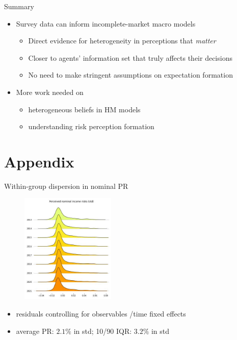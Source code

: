 \documentclass{beamer}
\begin{document}
\begin{frame}{Summary}
	
	\begin{itemize}
 	\item Survey data can inform incomplete-market macro models 
 	\begin{itemize}
 		\item Direct evidence for heterogeneity in perceptions that \textit{matter}
 		\item Closer to agents' information set that truly affects their decisions
 			\item No need to make stringent assumptions on expectation formation
 	\end{itemize}

	\item More work needed on 
	\begin{itemize}
		\item heterogeneous beliefs in HM models
		\item understanding risk perception formation  
	\end{itemize}
	\end{itemize}
\end{frame}





\section*{Appendix}



\begin{frame}{Within-group dispersion in nominal PR}
	\label{appendix:incstd}
	\begin{figure}
		\centering
		\includegraphics[width=0.4\textwidth]{figures/joy_incstd.jpg}
	\end{figure}
	\begin{itemize}
		\item  residuals controlling for observables /time fixed effects
		\item average PR:  $2.1\%$ in std; 10/90 IQR: $3.2\%$ in std \quad \hyperlink{rincstd_hist}{}    
	\end{itemize}
\end{frame}
\end{document}

